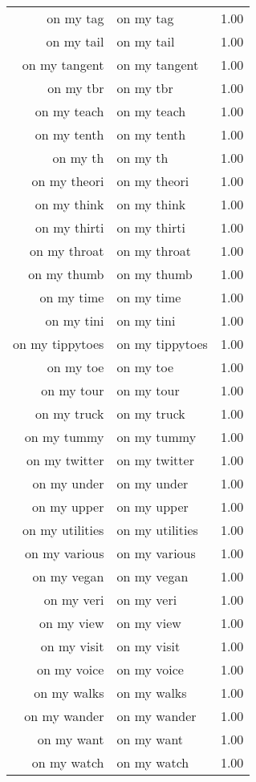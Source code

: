\begin{table}[ht]
\begin{tabular}{rlr}
  on my tag & on my tag & 1.00 \\ 
  on my tail & on my tail & 1.00 \\ 
  on my tangent & on my tangent & 1.00 \\ 
  on my tbr & on my tbr & 1.00 \\ 
  on my teach & on my teach & 1.00 \\ 
  on my tenth & on my tenth & 1.00 \\ 
  on my th & on my th & 1.00 \\ 
  on my theori & on my theori & 1.00 \\ 
  on my think & on my think & 1.00 \\ 
  on my thirti & on my thirti & 1.00 \\ 
  on my throat & on my throat & 1.00 \\ 
  on my thumb & on my thumb & 1.00 \\ 
  on my time & on my time & 1.00 \\ 
  on my tini & on my tini & 1.00 \\ 
  on my tippytoes & on my tippytoes & 1.00 \\ 
  on my toe & on my toe & 1.00 \\ 
  on my tour & on my tour & 1.00 \\ 
  on my truck & on my truck & 1.00 \\ 
  on my tummy & on my tummy & 1.00 \\ 
  on my twitter & on my twitter & 1.00 \\ 
  on my under & on my under & 1.00 \\ 
  on my upper & on my upper & 1.00 \\ 
  on my utilities & on my utilities & 1.00 \\ 
  on my various & on my various & 1.00 \\ 
  on my vegan & on my vegan & 1.00 \\ 
  on my veri & on my veri & 1.00 \\ 
  on my view & on my view & 1.00 \\ 
  on my visit & on my visit & 1.00 \\ 
  on my voice & on my voice & 1.00 \\ 
  on my walks & on my walks & 1.00 \\ 
  on my wander & on my wander & 1.00 \\ 
  on my want & on my want & 1.00 \\ 
  on my watch & on my watch & 1.00 \\ 

\end{tabular}
\end{table}
